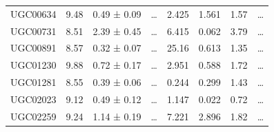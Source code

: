 \documentclass[reprint,%
 amsmath,amssymb,
 aps,
]{revtex4-1}
\begin{document}
\begin{longtable*}{|c|c|c|c|c|c|c|c| }
UGC00634             & 9.48                      & 0.49 ± 0.09           & …                      & 2.425                                                        & 1.561                                                          & 1.57                                                            & …                                                             \\
UGC00731             & 8.51                      & 2.39 ± 0.45           & …                      & 6.415                                                        & 0.062                                                         & 3.79                                                           & …                                                             \\
UGC00891             & 8.57                      & 0.32 ± 0.07           & …                      & 25.16                                                        & 0.613                                                          & 1.35                                                           & …                                                             \\
UGC01230             & 9.88                      & 0.72 ± 0.17           & …                      & 2.951                                                        & 0.588                                                         & 1.72                                                           & …                                                             \\
UGC01281             & 8.55                      & 0.39 ± 0.06           & …                      & 0.244                                                        & 0.299                                                          & 1.43                                                         & …                                                             \\
UGC02023             & 9.12                      & 0.49 ± 0.12           & …                      & 1.147                                                        & 0.022                                                         & 0.72                                                        & …                                                             \\
UGC02259             & 9.24                      & 1.14 ± 0.19           & …                      & 7.221                                                        & 2.896                                                          & 1.82                                                          & …                                                             \\

\end{longtable*}
\end{document}

